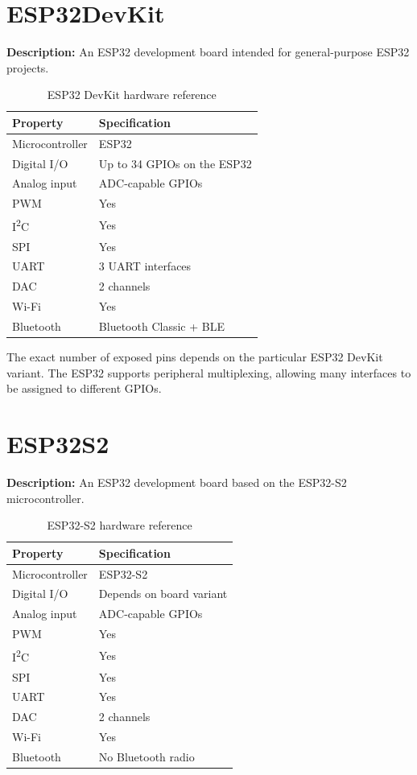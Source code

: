 \section{ESP32DevKit}

\textbf{Description:} An ESP32 development board intended for
general-purpose ESP32 projects.

\begin{table}[H]
\centering
\caption{ESP32 DevKit hardware reference}
\label{tab:board-esp32-devkit}
\begin{tabular}{ll}
\toprule
\textbf{Property} & \textbf{Specification} \\
\midrule
Microcontroller & ESP32 \\
Digital I/O & Up to 34 GPIOs on the ESP32 \\
Analog input & ADC-capable GPIOs \\
PWM & Yes \\
I\textsuperscript{2}C & Yes \\
SPI & Yes \\
UART & 3 UART interfaces \\
DAC & 2 channels \\
Wi-Fi & Yes \\
Bluetooth & Bluetooth Classic + BLE \\
\bottomrule
\end{tabular}
\end{table}

The exact number of exposed pins depends on the particular ESP32 DevKit
variant. The ESP32 supports peripheral multiplexing, allowing many
interfaces to be assigned to different GPIOs.

\section{ESP32S2}

\textbf{Description:} An ESP32 development board based on the ESP32-S2
microcontroller.

\begin{table}[H]
\centering
\caption{ESP32-S2 hardware reference}
\label{tab:board-esp32-s2}
\begin{tabular}{ll}
\toprule
\textbf{Property} & \textbf{Specification} \\
\midrule
Microcontroller & ESP32-S2 \\
Digital I/O & Depends on board variant \\
Analog input & ADC-capable GPIOs \\
PWM & Yes \\
I\textsuperscript{2}C & Yes \\
SPI & Yes \\
UART & Yes \\
DAC & 2 channels \\
Wi-Fi & Yes \\
Bluetooth & No Bluetooth radio \\
\bottomrule
\end{tabular}
\end{table}

